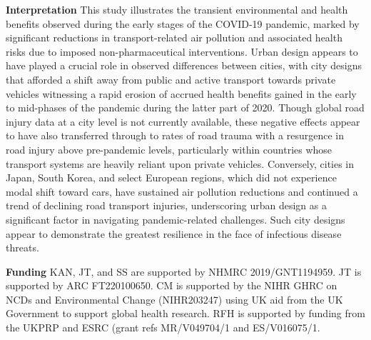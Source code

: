 \documentclass[preprint,10pt]{elsarticle} %
\newcommand{\absdiv}[1]{%
  \par\addvspace{.5\baselineskip}%
  \noindent\textbf{#1}\quad\ignorespaces}
\begin{document}
 \absdiv{\textcolor{OliveGreen}{Interpretation}}
This study illustrates the transient environmental and health benefits observed during the early stages of the COVID-19 pandemic, marked by significant reductions in transport-related air pollution and associated health risks due to imposed non-pharmaceutical interventions. Urban design appears to have played a crucial role in observed differences between cities, with city designs that afforded a shift away from public and active transport towards private vehicles witnessing a rapid erosion of accrued health benefits gained in the early to mid-phases of the pandemic during the latter part of 2020. Though global road injury data at a city level is not currently available, these negative effects appear to have also transferred through to rates of road trauma with a resurgence in road injury above pre-pandemic levels, particularly within countries whose transport systems are heavily reliant upon private vehicles. Conversely, cities in Japan, South Korea, and select European regions, which did not experience modal shift toward cars, have sustained air pollution reductions and continued a trend of declining road transport injuries, underscoring urban design as a significant factor in navigating pandemic-related challenges. Such city designs appear to demonstrate the greatest resilience in the face of infectious disease threats. 
 \absdiv{\textcolor{OliveGreen}{Funding}}
 KAN, JT, and SS are supported by NHMRC 2019/GNT1194959. JT is supported by ARC FT220100650. CM is supported by the NIHR GHRC on NCDs and Environmental Change (NIHR203247) using UK aid from the UK Government to support global health research. RFH is supported by funding from the UKPRP and ESRC (grant refs MR/V049704/1 and ES/V016075/1.
\end{document}
